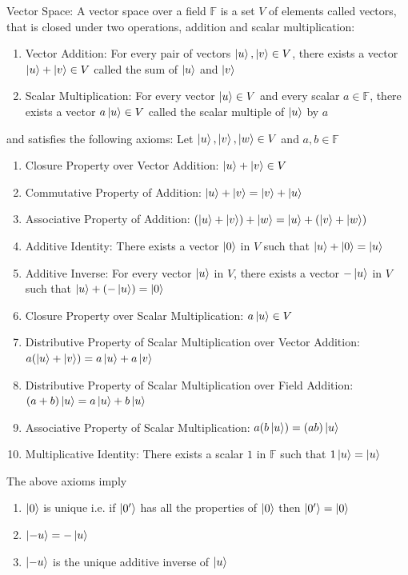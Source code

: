 \begin{definition}
    Vector Space: A vector space over a field $\mathbb{F}$ is a set $V$ of elements called vectors, that is closed
    under two operations, addition and scalar multiplication:
    \begin{enumerate}
        \item Vector Addition: For every pair of vectors $\ket{u},\ket{v}\in V$, there exists a vector $\ket{u}+\ket{v}\in V$ called the sum of $\ket{u}$ and $\ket{v}$
        \item Scalar Multiplication: For every vector $\ket{u}\in V$ and every scalar $a\in\mathbb{F}$, there exists a vector $a\ket{u}\in V$ called the scalar multiple of $\ket{u}$ by $a$
    \end{enumerate}
    and satisfies the following axioms:
    Let $\ket{u},\ket{v},\ket{w}\in V$ and $a,b\in\mathbb{F}$
    \label{def:Axioms of Vector Space}
    \begin{enumerate}
        \item Closure Property over Vector Addition: $\ket{u}+\ket{v}\in V$
        \item Commutative Property of Addition: $\ket{u}+\ket{v}=\ket{v}+\ket{u}$
        \item Associative Property of Addition: $(\ket{u}+\ket{v})+\ket{w}=\ket{u}+(\ket{v}+\ket{w})$
        \item Additive Identity: There exists a vector $\ket{0}$ in $V$ such that $\ket{u}+\ket{0}=\ket{u}$
        \item Additive Inverse: For every vector $\ket{u}$ in $V$, there exists a vector $-\ket{u}$ in $V$ such that $\ket{u}+(-\ket{u})=\ket{0}$
        \item Closure Property over Scalar Multiplication: $a\ket{u}\in V$
        \item Distributive Property of Scalar Multiplication over Vector Addition: $a(\ket{u}+\ket{v})=a\ket{u}+a\ket{v}$
        \item Distributive Property of Scalar Multiplication over Field Addition: $(a+b)\ket{u}=a\ket{u}+b\ket{u}$
        \item Associative Property of Scalar Multiplication: $a(b\ket{u})=(ab)\ket{u}$
        \item Multiplicative Identity: There exists a scalar $1$ in $\mathbb{F}$ such that $1\ket{u}=\ket{u}$
    \end{enumerate}
\end{definition}

The above axioms imply
\begin{enumerate}
    \item $\ket{0}$ is unique i.e. if $\ket{0'}$ has all the properties of $\ket{0}$ then $\ket{0'}=\ket{0}$
    \item $\ket{-u}=-\ket{u}$ 
    \item $\ket{-u}$ is the unique additive inverse of $\ket{u}$
\end{enumerate}

